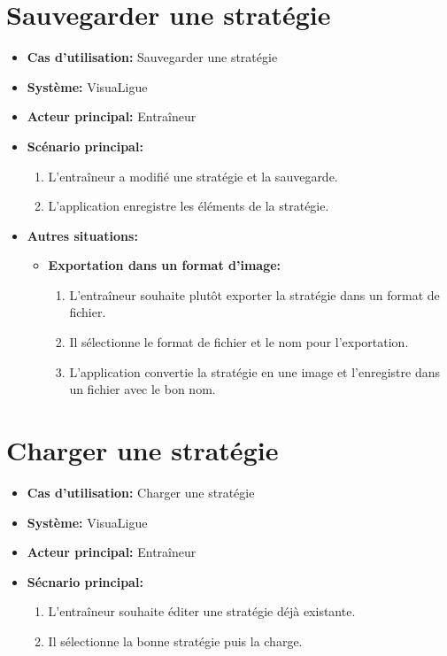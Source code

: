 \section{Sauvegarder une stratégie}
\label{sec:exporter_une_strategie}
\begin{itemize}
    \item \textbf{Cas d'utilisation:} Sauvegarder une strat\'egie
    \item \textbf{Syst\`eme:} VisuaLigue
    \item \textbf{Acteur principal:} Entra\^ineur
    \item \textbf{Sc\'enario principal:}
        \begin{enumerate}
            \item L'entra\^ineur a modifié une strat\'egie et la sauvegarde.
            \item L'application enregistre les \'el\'ements de la strat\'egie.
        \end{enumerate}
    \item \textbf{Autres situations:}
        \begin{itemize}
            \item \textbf{Exportation dans un format d'image:}
                \begin{enumerate}
                    \item L'entra\^ineur souhaite plut\^ot exporter la strat\'egie dans un format de fichier.
                    \item Il s\'electionne le format de fichier et le nom pour l'exportation.
                    \item L'application convertie la strat\'egie en une image et l'enregistre dans un fichier avec le bon nom.
                \end{enumerate}
        \end{itemize}
\end{itemize}



\section{Charger une strat\'egie}
\label{sec:charger_une_strat'egie}

\begin{itemize}
    \item \textbf{Cas d'utilisation:} Charger une strat\'egie
    \item \textbf{Syst\`eme:} VisuaLigue
    \item \textbf{Acteur principal:} Entra\^ineur
    \item \textbf{S\'ecnario principal:}
        \begin{enumerate}
            \item L'entra\^ineur souhaite \'editer une strat\'egie d\'ej\`a existante.
            \item Il s\'electionne la bonne strat\'egie puis la charge.
        \end{enumerate}
\end{itemize}
